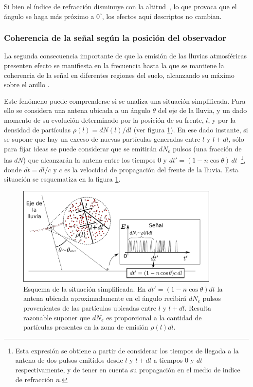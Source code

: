 	Si bien el \'indice de refracci\'on disminuye con la altitud~\cite{zhairezAir}, lo que provoca que el \'angulo \cher{} se haga m\'as pr\'oximo a $0^\circ$, los efectos aqu\'i descriptos no cambian.  
	
	\subsubsection{Coherencia de la se\~nal seg\'un la posici\'on del observador}
	
	La segunda consecuencia importante de que la emisi\'on de las lluvias atmosf\'ericas presenten efecto \cher{} se manifiesta en la frecuencia hasta la que se mantiene la coherencia de la se\~nal en diferentes regiones del suelo, alcanzando su m\'aximo sobre el anillo \cher{}.
	
	Este fen\'omeno puede comprenderse si se analiza una situaci\'on simplificada.
	Para ello se considera una antena ubicada a un \'angulo $\theta$ del eje de la lluvia, y un dado momento de su evoluci\'on determinado por la posici\'on de su frente, $l$, y por la densidad de part\'iculas $\rho(l)=dN(l)/dl$ (ver figura \ref{fig:coherencia_1}).
	En ese dado instante, si se supone que hay un exceso de nuevas part\'iculas generadas entre $l$ y $l+dl$, s\'olo para fijar ideas se puede considerar que se emitir\'an $dN_e$ pulsos  (una fracci\'on de las $dN$) que alcanzar\'an la antena entre los tiempos $0$ y $dt'=(1-n\cos\theta)\,dt$~\footnote{Esta expresi\'on se obtiene a partir de considerar los tiempos de llegada a la antena de dos pulsos emitidos desde $l$ y $l+dl$ a tiempos $0$ y $dt$ respectivamente, y de tener en cuenta su propagaci\'on en el medio de indice de refracci\'on $n$.}, donde $dt=dl/c$ y $c$ es la velocidad de propagaci\'on del frente de la lluvia.
	Esta situaci\'on se esquematiza en la figura \ref{fig:coherencia_1}.
	\begin{figure}[ht!]
		\centering
		\includegraphics[width=0.9\textwidth]{fig/EASRadio/coherencia_2}
		\caption{\label{fig:coherencia_1} Esquema de la situaci\'on simplificada. En $dt'=(1-n\cos\theta)dt$ la antena ubicada aproximadamente en el \'angulo \cher{} recibir\'a $dN_e$ pulsos provenientes de las part\'iculas ubicadas entre $l$ y $l+dl$. Resulta razonable suponer que $dN_e$ es proporcional a la cantidad de part\'iculas presentes en la zona de emisi\'on $\rho(l)dl$.}
	\end{figure}
	
